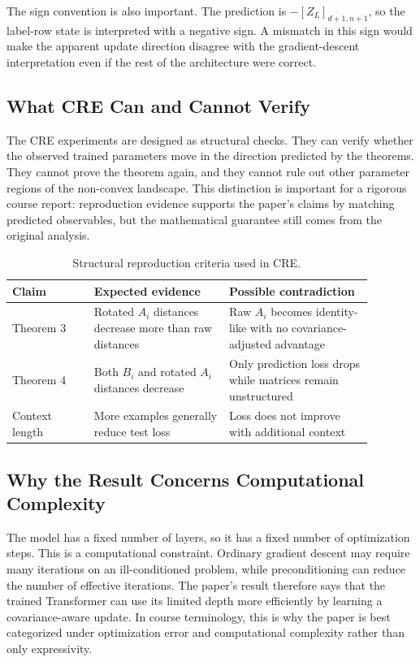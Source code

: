 \documentclass[conference]{IEEEtran}
\begin{document}
The sign convention is also important. The prediction is $-[Z_L]_{d+1,n+1}$, so the label-row state is interpreted with a negative sign. A mismatch in this sign would make the apparent update direction disagree with the gradient-descent interpretation even if the rest of the architecture were correct.

\subsection{What CRE Can and Cannot Verify}
The CRE experiments are designed as structural checks. They can verify whether the observed trained parameters move in the direction predicted by the theorems. They cannot prove the theorem again, and they cannot rule out other parameter regions of the non-convex landscape. This distinction is important for a rigorous course report: reproduction evidence supports the paper's claims by matching predicted observables, but the mathematical guarantee still comes from the original analysis.

\begin{table}[!t]
\centering
\caption{Structural reproduction criteria used in CRE.}
\label{tab:criteria}
\begin{tabular}{p{0.20\linewidth}p{0.33\linewidth}p{0.35\linewidth}}
\toprule
Claim & Expected evidence & Possible contradiction\\
\midrule
Theorem 3 & Rotated $A_i$ distances decrease more than raw distances & Raw $A_i$ becomes identity-like with no covariance-adjusted advantage\\
Theorem 4 & Both $B_i$ and rotated $A_i$ distances decrease & Only prediction loss drops while matrices remain unstructured\\
Context length & More examples generally reduce test loss & Loss does not improve with additional context\\
\bottomrule
\end{tabular}
\end{table}

\subsection{Why the Result Concerns Computational Complexity}
The model has a fixed number of layers, so it has a fixed number of optimization steps. This is a computational constraint. Ordinary gradient descent may require many iterations on an ill-conditioned problem, while preconditioning can reduce the number of effective iterations. The paper's result therefore says that the trained Transformer can use its limited depth more efficiently by learning a covariance-aware update. In course terminology, this is why the paper is best categorized under optimization error and computational complexity rather than only expressivity.
\end{document}
